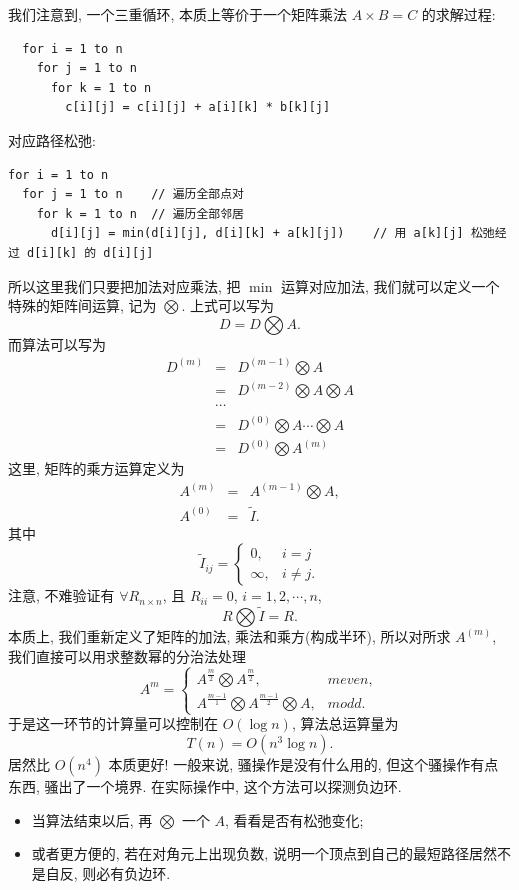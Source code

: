 \documentclass[a4paper]{ctexart}
\theoremstyle{definition}
\theoremstyle{definition}
\begin{document}
我们注意到, 一个三重循环, 本质上等价于一个矩阵乘法 $A \times B = C$ 的求解过程:
\begin{verbatim}
  for i = 1 to n
    for j = 1 to n
      for k = 1 to n
        c[i][j] = c[i][j] + a[i][k] * b[k][j]
\end{verbatim}
对应路径松弛:
\begin{verbatim}
for i = 1 to n
  for j = 1 to n    // 遍历全部点对
    for k = 1 to n  // 遍历全部邻居
      d[i][j] = min(d[i][j], d[i][k] + a[k][j])    // 用 a[k][j] 松弛经过 d[i][k] 的 d[i][j]
\end{verbatim}
所以这里我们只要把加法对应乘法, 把 $\min$ 运算对应加法, 我们就可以定义一个特殊的矩阵间运算, 记为 $\bigotimes$. 
上式可以写为
$$
D = D \bigotimes A.
$$
而算法可以写为
$$
\begin{array}{rcl}
  D^{(m)} &=& D^{(m - 1)} \bigotimes A \\
  &=& D^{(m - 2)} \bigotimes A \bigotimes A \\
  &\cdots& \\
  &=& D^{(0)} \bigotimes A \cdots \bigotimes A \\
  &=& D^{(0)} \bigotimes A^{(m)} 
 \end{array}
$$
这里, 矩阵的乘方运算定义为
$$
\begin{array}{rcl}
  A^{(m)} &=& A^{(m - 1)} \bigotimes A, \\
  A^{(0)} &=& \tilde{I}.
\end{array}
$$
其中
$$
\tilde{I}_{ij} = \left\{
  \begin{array}{ll}
    0, & i = j \\
    \infty, & i \neq j.
  \end{array}
\right.
$$
注意, 不难验证有 $\forall R_{n\times n}$, 且 $R_{ii} = 0$, $i = 1, 2, \cdots, n$,
$$
R \bigotimes \tilde{I} = R.
$$
本质上, 我们重新定义了矩阵的加法, 乘法和乘方(构成半环), 所以对所求 $A^{(m)}$, 我们直接可以用求整数幂的分治法处理
$$
A^{m} = \left\{
\begin{array}{ll}
  A^{\frac{m}{2}} \bigotimes A^{\frac{m}{2}}, & m even, \\
  A^{\frac{m - 1}{1}} \bigotimes A^{\frac{m - 1}{2}} \bigotimes A, & m odd.
\end{array}
\right.
$$
于是这一环节的计算量可以控制在 $O(\log n)$, 算法总运算量为 
$$
T(n) = O(n^3 \log n).
$$
居然比 $O(n^4)$ 本质更好! 一般来说, 骚操作是没有什么用的, 但这个骚操作有点东西, 骚出了一个境界. 
在实际操作中, 这个方法可以探测负边环. 
\begin{itemize}
  \item 当算法结束以后, 再 $\bigotimes$ 一个 $A$, 看看是否有松弛变化;
  \item 或者更方便的, 若在对角元上出现负数, 说明一个顶点到自己的最短路径居然不是自反, 则必有负边环. 
\end{itemize}
\end{document}

